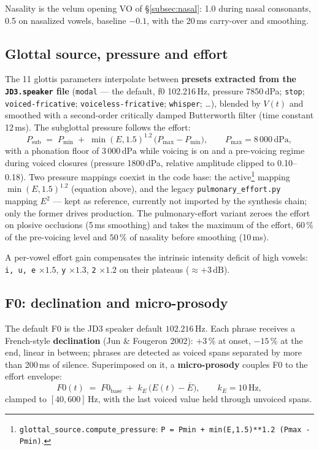 \documentclass[11pt,a4paper]{article}
\newcommand{\code}[1]{\texttt{#1}}
\begin{document}
Nasality is the velum opening VO of \S\ref{subsec:nasal}: 1.0 during
nasal consonants, 0.5 on nasalized vowels, baseline \(-0.1\), with the
20\,ms carry-over and smoothing.

\subsection{Glottal source, pressure and effort}

The 11 glottis parameters interpolate between \textbf{presets extracted
from the \texttt{JD3.speaker} file} (\texttt{modal} --- the default, f0
102.216\,Hz, pressure 7850\,dPa; \texttt{stop}; \texttt{voiced-fricative};
\texttt{voiceless-fricative}; \texttt{whisper}; \ldots), blended by
\(V(t)\) and smoothed with a second-order critically damped Butterworth
filter (time constant 12\,ms). The subglottal pressure follows the
effort:
\begin{equation}
P_{\mathrm{sub}} \;=\; P_{\min} \;+\; \min(E, 1.5)^{1.2}\,
\big(P_{\max} - P_{\min}\big),
\qquad P_{\max} = 8\,000\,\mathrm{dPa},
\label{eq:pressure}
\end{equation}
with a phonation floor of \(3\,000\,\mathrm{dPa}\) while voicing is on
and a pre-voicing regime during voiced closures (pressure 1800\,dPa,
relative amplitude clipped to 0.10--0.18). Two pressure mappings coexist in the code base: the active\footnote{\code{glottal\_source.compute\_pressure}: \code{P = Pmin + min(E,1.5)**1.2 (Pmax - Pmin)}.} mapping \(\min(E,1.5)^{1.2}\) (equation above), and the legacy \code{pulmonary\_effort.py} mapping \(E^2\) --- kept as reference, currently not imported by the synthesis chain; only the former drives production. The pulmonary-effort variant
zeroes the effort on plosive occlusions (5\,ms smoothing) and takes the
maximum of the effort, \(60\,\%\) of the pre-voicing level and
\(50\,\%\) of nasality before smoothing (10\,ms).

A per-vowel effort gain compensates the intrinsic intensity deficit of
high vowels: \texttt{i, u, e} \(\times 1.5\), \texttt{y}
\(\times 1.3\), \texttt{2} \(\times 1.2\) on their plateaus
(\(\approx +3\,\mathrm{dB}\)).

\subsection{F0: declination and micro-prosody}

The default F0 is the JD3 speaker default \(102.216\,\mathrm{Hz}\). Each
phrase receives a French-style \textbf{declination} (Jun \& Fougeron
2002): \(+3\,\%\) at onset, \(-15\,\%\) at the end, linear in between;
phrases are detected as voiced spans separated by more than 200\,ms of
silence. Superimposed on it, a \textbf{micro-prosody} couples F0 to the
effort envelope:
\begin{equation}
F0(t) \;=\; F0_{\mathrm{base}} \;+\; k_E\,\big(E(t) - \overline{E}\big),
\qquad k_E = 10\,\mathrm{Hz},
\end{equation}
clamped to \([40, 600]\,\mathrm{Hz}\), with the last voiced value held
through unvoiced spans.
\end{document}
